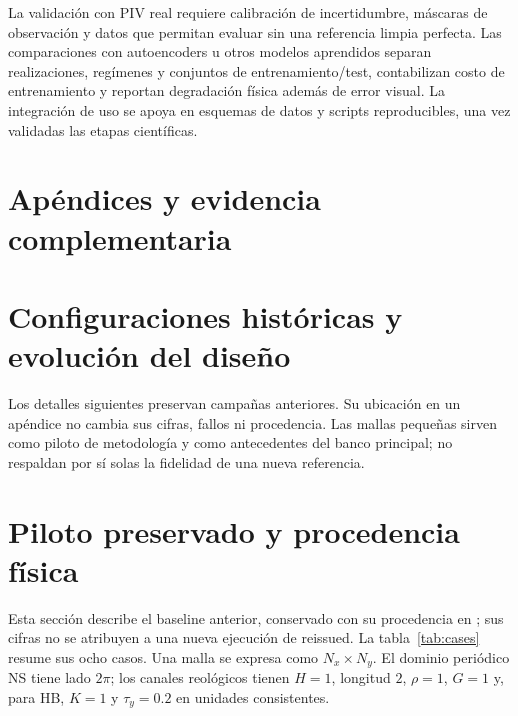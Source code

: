 \documentclass[11pt,oneside,openany]{book}
\begin{document}
La validación con PIV real requiere calibración de incertidumbre,
máscaras de observación y datos que permitan evaluar sin una
referencia limpia perfecta. Las comparaciones con autoencoders u otros
modelos aprendidos separan realizaciones, regímenes y conjuntos de
entrenamiento/test, contabilizan costo de entrenamiento y reportan
degradación física además de error visual. La integración de uso se
apoya en esquemas de datos y scripts reproducibles, una vez validadas
las etapas científicas.

\clearpage
\section*{Apéndices y evidencia complementaria}
\setcounter{section}{0}
\renewcommand{\thesection}{A.\arabic{section}}
\renewcommand{\thesubsection}{\thesection.\arabic{subsection}}
\setcounter{figure}{0}
\renewcommand{\thefigure}{A.\arabic{figure}}
\setcounter{table}{0}
\renewcommand{\thetable}{A.\arabic{table}}

\section{Configuraciones históricas y evolución del diseño}
Los detalles siguientes preservan campañas anteriores. Su ubicación en un
apéndice no cambia sus cifras, fallos ni procedencia. Las mallas pequeñas
sirven como piloto de metodología y como antecedentes del banco principal;
no respaldan por sí solas la fidelidad de una nueva referencia.

\section{Piloto preservado y procedencia física}
Esta sección describe el baseline anterior, conservado con su procedencia en
; sus cifras no se atribuyen a una
nueva ejecución de reissued. La tabla~\ref{tab:cases} resume sus ocho casos. Una malla se
expresa como $N_x\times N_y$. El dominio periódico NS tiene lado $2\pi$;
los canales reológicos tienen $H=1$, longitud $2$, $\rho=1$, $G=1$ y,
para HB, $K=1$ y $\tau_y=0.2$ en unidades consistentes.
\end{document}
